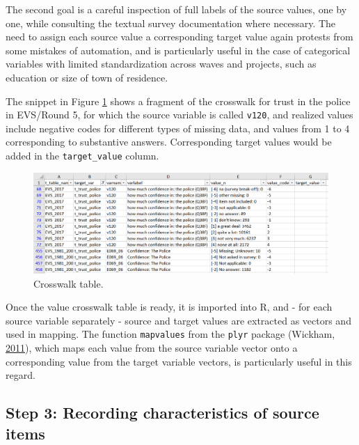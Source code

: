 \documentclass[12pt,]{article}
\begin{document}
The second goal is a careful inspection of full labels of the source values, one by one, while consulting the textual survey documentation where necessary. The need to assign each source value a corresponding target value again protests from some mistakes of automation, and is particularly useful in the case of categorical variables with limited standardization across waves and projects, such as education or size of town of residence.

The snippet in Figure \ref{fig:cwt} shows a fragment of the crosswalk for trust in the police in EVS/Round 5, for which the source variable is called \texttt{v120}, and realized values include negative codes for different types of missing data, and values from 1 to 4 corresponding to substantive answers. Corresponding target values would be added in the \texttt{target\_value} column.

\begin{figure}
\includegraphics[width=465px]{pictures/cwt_empty} \caption{Crosswalk table.}\label{fig:cwt}
\end{figure}

Once the value crosswalk table is ready, it is imported into R, and - for each source variable separately - source and target values are extracted as vectors and used in mapping. The function \texttt{mapvalues} from the \texttt{plyr} package (Wickham, \protect\hyperlink{ref-Wickham2011}{2011}), which maps each value from the source variable vector onto a corresponding value from the target variable vectors, is particularly useful in this regard.

\hypertarget{step-3-recording-characteristics-of-source-items}{%
\subsection{Step 3: Recording characteristics of source items}\label{step-3-recording-characteristics-of-source-items}}
\end{document}
